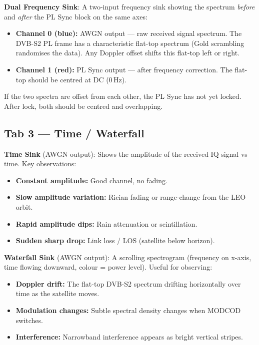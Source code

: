 \documentclass[12pt,a4paper]{report}
\begin{document}
\textbf{Dual Frequency Sink}: A two-input frequency sink showing the spectrum
\emph{before} and \emph{after} the PL Sync block on the same axes:
\begin{itemize}[nosep]
    \item \textbf{Channel 0 (blue):} AWGN output --- raw received signal
          spectrum.  The DVB-S2 PL frame has a characteristic flat-top
          spectrum (Gold scrambling randomises the data).  Any Doppler offset
          shifts this flat-top left or right.
    \item \textbf{Channel 1 (red):} PL Sync output --- after frequency
          correction.  The flat-top should be centred at DC (0\,Hz).
\end{itemize}
If the two spectra are offset from each other, the PL Sync has not yet locked.
After lock, both should be centred and overlapping.

\subsection{Tab 3 --- Time / Waterfall}

\textbf{Time Sink} (AWGN output): Shows the amplitude of the received IQ
signal vs time.  Key observations:
\begin{itemize}[nosep]
    \item \textbf{Constant amplitude:} Good channel, no fading.
    \item \textbf{Slow amplitude variation:} Rician fading or range-change from the LEO orbit.
    \item \textbf{Rapid amplitude dips:} Rain attenuation or scintillation.
    \item \textbf{Sudden sharp drop:} Link loss / LOS (satellite below horizon).
\end{itemize}

\textbf{Waterfall Sink} (AWGN output): A scrolling spectrogram (frequency on
x-axis, time flowing downward, colour = power level).  Useful for observing:
\begin{itemize}[nosep]
    \item \textbf{Doppler drift:} The flat-top DVB-S2 spectrum drifting
          horizontally over time as the satellite moves.
    \item \textbf{Modulation changes:} Subtle spectral density changes when
          MODCOD switches.
    \item \textbf{Interference:} Narrowband interference appears as bright
          vertical stripes.
\end{itemize}
\end{document}
